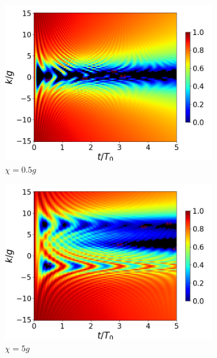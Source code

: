\begin{figure}[h]
    \begin{subfigure}{0.49\textwidth}
        \includegraphics[width=\textwidth]{figuras/ch4/concu/k/eg1+ge1 d=0.0g x=0.5g J=15.0g gamma=0.25g concu k dis.png}
        \caption{$\chi=0.5g$}
        \label{fig4:concu k 1 x1}
    \end{subfigure}
    \hfill
    \begin{subfigure}{0.49\textwidth}
        \includegraphics[width=\textwidth]{figuras/ch4/concu/k/eg1+ge1 d=0.0g x=5.0g J=15.0g gamma=0.25g concu k dis.png}
        \caption{$\chi=5g$}
        \label{fig4:concu k 1 x2}
    \end{subfigure}
    \caption{}
    \label{fig4:concu k params 1}
\end{figure}

